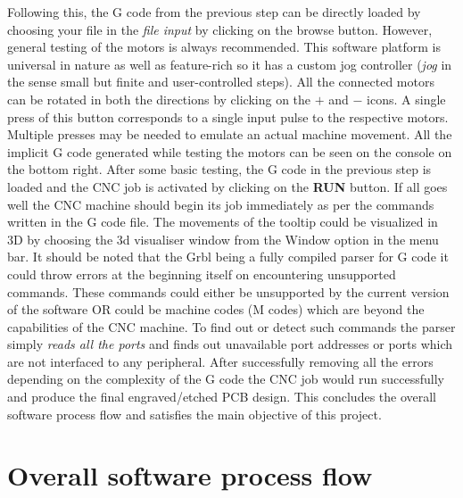 Following this, the G code from the previous step can be directly loaded by choosing your file in the \textit{file input} by clicking on the browse button. However, general testing of the motors is always recommended. This software platform is universal in nature as well as feature-rich so it has a custom jog controller (\textit{jog} in the sense small but finite and user-controlled steps). All the connected motors can be rotated in both the directions by clicking on the $\boldsymbol{+}$ and $\boldsymbol{-}$ icons. A single press of this button corresponds to a single input pulse to the respective motors. Multiple presses may be needed to emulate an actual machine movement. All the implicit G code generated while testing the motors can be seen on the console on the bottom right. After some basic testing, the G code in the previous step is loaded and the CNC job is activated by clicking on the \textbf{RUN} button. If all goes well the CNC machine should begin its job immediately as per the commands written in the G code file. The movements of the tooltip could be visualized in 3D by choosing the 3d visualiser window from the Window option in the menu bar. It should be noted that the Grbl being a fully compiled parser for G code it could throw errors at the beginning itself on encountering unsupported commands. These commands could either be unsupported by the current version of the software OR could be machine codes (M codes) which are beyond the capabilities of the CNC machine. To find out or detect such commands the parser simply \textit{reads all the ports} and finds out unavailable port addresses or ports which are not interfaced to any peripheral. After successfully removing all the errors depending on the complexity of the G code the CNC job would run successfully and produce the final engraved/etched PCB design. This concludes the overall software process flow and satisfies the main objective of this project.


\section{Overall software process flow}


